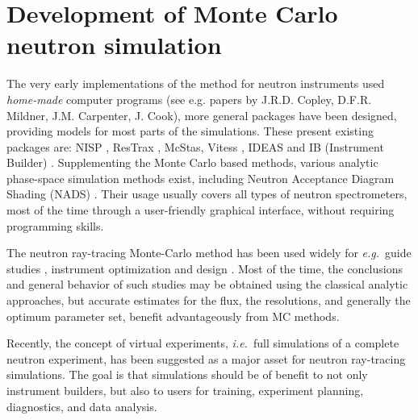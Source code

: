 \section{Development of Monte Carlo neutron simulation}
The very early implementations of the method for neutron instruments used \emph{home-made} computer programs  (see e.g. papers by J.R.D. Copley, D.F.R. Mildner, J.M. Carpenter, J. Cook), more general packages have been designed, providing models for most parts of the simulations.
These present existing packages are: NISP \cite{NISP}, ResTrax
\cite{Restrax}, McStas\cite{mcs_ppf,nn_10_20,mcstas_pb,mcs_ppf,mcstas_webpage},
Vitess \cite{Vitess,vitess_webpage}, IDEAS \cite{IDEAS} and IB (Instrument
Builder) \cite{IB_webpage}. Supplementing the Monte Carlo based
methods, various analytic phase-space simulation methods exist,
including Neutron Acceptance Diagram Shading (NADS) \cite{NADS_webpage}.
Their usage usually covers all types of neutron spectrometers, most of the time through a user-friendly graphical interface, without requiring programming skills.

The neutron ray-tracing Monte-Carlo method has been used widely for
{\em e.g.}\ guide studies \cite{Copley93,Farhi02,Schanzer04},
instrument optimization and design \cite{Zsigmond04,Lieutenant05}.
Most of the time, the conclusions and general behavior of such studies
may be obtained using the classical analytic approaches,
but accurate estimates for the flux, the resolutions,
and generally the optimum parameter set, benefit advantageously from MC methods.

Recently, the concept of virtual experiments, {\em i.e.}\ full simulations
of a complete neutron experiment, has been suggested as a major asset for neutron ray-tracing simulations. The goal is that
simulations should be of benefit to not only instrument builders, but also
to users for training, experiment planning, diagnostics, and data
analysis.

